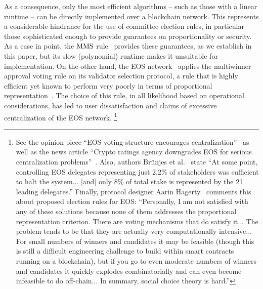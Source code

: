 As a consequence, only the most efficient algorithms -- such as those with a linear runtime -- can be directly implemented over a blockchain network. This represents a considerable hindrance for the use of committee election rules, in particular those sophisticated enough to provide guarantees on proportionality or security. 
As a case in point, the $\operatorname{MMS}$ rule~\cite{sanchez2016maximin} provides these guarantees, as we establish in this paper, but its slow (polynomial) runtime makes it unsuitable for implementation. On the other hand, the EOS network~\cite{griggeos} applies the multiwinner approval voting rule on its validator selection protocol, a rule that is highly efficient yet known to perform very poorly in terms of proportional representation~\cite[Table 2]{lackner2020approval}. 
The choice of this rule, in all likelihood based on operational considerations, has led to user dissatisfaction and claims of excessive centralization of the EOS network.%
%
\footnote{See the 
 opinion piece ``EOS voting structure encourages centralization''~\cite{garg} as well as the 
news article ``Crypto ratings agency downgrades EOS for serious centralization problems''~\cite{chong}. 
Also, authors Br{\"u}njes et al.~\cite{brunjes2020reward} state ``At some point, controlling EOS delegates representing just 2.2\% of stakeholders was sufficient to halt the system... [and] only 8\% of total stake is represented by the 21 leading delegates.'' 
Finally, protocol designer Aarin Hagerty~\cite{hagerty} comments this about proposed election rules for EOS: ``Personally, I am not satisfied with any of these solutions because none of them addresses the proportional representation criterion. There are voting mechanisms that do satisfy it... The problem tends to be that they are actually very computationally intensive... For small numbers of winners and candidates it may be feasible (though this is still a difficult engineering challenge to build within smart contracts running on a blockchain), but if you go to even moderate numbers of winners and candidates it quickly explodes combinatorially and can even become infeasible to do off-chain... In summary, social choice theory is hard.''}

